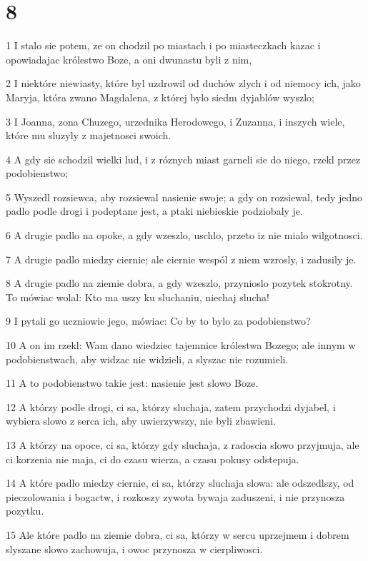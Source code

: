 \chapter{8}

\par 1 I stalo sie potem, ze on chodzil po miastach i po miasteczkach kazac i opowiadajac królestwo Boze, a oni dwunastu byli z nim,
\par 2 I niektóre niewiasty, które byl uzdrowil od duchów zlych i od niemocy ich, jako Maryja, która zwano Magdalena, z której bylo siedm dyjablów wyszlo;
\par 3 I Joanna, zona Chuzego, urzednika Herodowego, i Zuzanna, i inszych wiele, które mu sluzyly z majetnosci swoich.
\par 4 A gdy sie schodzil wielki lud, i z róznych miast garneli sie do niego, rzekl przez podobienstwo;
\par 5 Wyszedl rozsiewca, aby rozsiewal nasienie swoje; a gdy on rozsiewal, tedy jedno padlo podle drogi i podeptane jest, a ptaki niebieskie podziobaly je.
\par 6 A drugie padlo na opoke, a gdy wzeszlo, uschlo, przeto iz nie mialo wilgotnosci.
\par 7 A drugie padlo miedzy ciernie; ale ciernie wespól z niem wzrosly, i zadusily je.
\par 8 A drugie padlo na ziemie dobra, a gdy wzeszlo, przynioslo pozytek stokrotny. To mówiac wolal: Kto ma uszy ku sluchaniu, niechaj slucha!
\par 9 I pytali go uczniowie jego, mówiac: Co by to bylo za podobienstwo?
\par 10 A on im rzekl: Wam dano wiedziec tajemnice królestwa Bozego; ale innym w podobienstwach, aby widzac nie widzieli, a slyszac nie rozumieli.
\par 11 A to podobienstwo takie jest: nasienie jest slowo Boze.
\par 12 A którzy podle drogi, ci sa, którzy sluchaja, zatem przychodzi dyjabel, i wybiera slowo z serca ich, aby uwierzywszy, nie byli zbawieni.
\par 13 A którzy na opoce, ci sa, którzy gdy sluchaja, z radoscia slowo przyjmuja, ale ci korzenia nie maja, ci do czasu wierza, a czasu pokusy odstepuja.
\par 14 A które padlo miedzy ciernie, ci sa, którzy sluchaja slowa: ale odszedlszy, od pieczolowania i bogactw, i rozkoszy zywota bywaja zaduszeni, i nie przynosza pozytku.
\par 15 Ale które padlo na ziemie dobra, ci sa, którzy w sercu uprzejmem i dobrem slyszane slowo zachowuja, i owoc przynosza w cierpliwosci.
